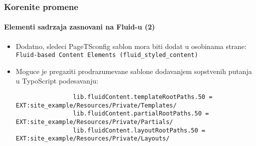 \begin{frame}[fragile]
	\frametitle{Korenite promene}
	\framesubtitle{Elementi sadrzaja zasnovani na Fluid-u (2)}

	\lstset{basicstyle=\tiny\ttfamily}

	\begin{itemize}

		\item Dodatno, sledeci PageTSconfig sablon mora biti dodat u osobinama strane:\newline
			\small
				\texttt{Fluid-based Content Elements (fluid\_styled\_content)}
			\normalsize

		\item Moguce je pregaziti prodrazumevane sablone dodavanjem sopstvenih putanja u TypoScript podesavanju:

			\begin{lstlisting}
				lib.fluidContent.templateRootPaths.50 = EXT:site_example/Resources/Private/Templates/
				lib.fluidContent.partialRootPaths.50 = EXT:site_example/Resources/Private/Partials/
				lib.fluidContent.layoutRootPaths.50 = EXT:site_example/Resources/Private/Layouts/
			\end{lstlisting}

	\end{itemize}

\end{frame}


